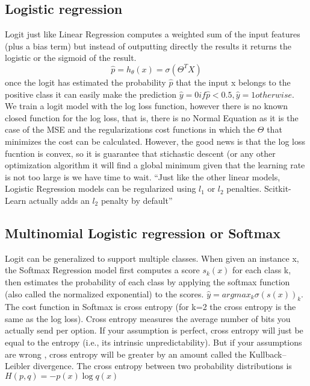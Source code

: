 \documentclass[12pt]{report}
\begin{document}
\subsection{Logistic regression}
Logit just like Linear Regression computes a weighted sum of the input features (plus a bias term) but instead of outputting directly the results it returns the logistic or the sigmoid of the result.
\begin{equation}
\hat{p} = h_{\theta}(x) = \sigma(\Theta^{T} X)
\end{equation}
once the logit has estimated the probability $\hat{p}$ that the input x belongs to the positive class it can easily make the prediction $\hat{y} = 0 if \hat{p} < 0.5, \hat{y} = 1 otherwise$. We train a logit model with the log loss function, however there is no known closed function for the log loss, that is, there is no Normal Equation as it is the case of the MSE and the regularizations cost functions in which the $\Theta$ that minimizes the cost can be calculated. However, the good news is that the log loss fucntion is convex, so it is guarantee that stichastic descent (or any other optimization algorithm it will find a global minimum given that the learning rate is not too large is we have time to wait.
“Just like the other linear models, Logistic Regression models can be regularized using $l_1$ or $l_2$ penalties. Scitkit-Learn actually adds an $l_2$ penalty by default”


\subsection{Multinomial Logistic regression or Softmax}

Logit can be generalized to support multiple classes. When given an instance x, the Softmax Regression model first computes a score $s_{k}(x)$ for each class k, then estimates the probability of each class by applying the softmax function (also called the normalized exponential) to the scores. $\hat{y}= argmax_{k} \sigma(s(x))_k$. The cost function in Softmax is cross entropy (for k=2 the cross entropy is the same as the log loss). Cross entropy measures the average number of bits you actually send per option. If your assumption is perfect, cross entropy will just be equal to the entropy (i.e., its intrinsic unpredictability). But if your assumptions are wrong , cross entropy will be greater by an amount called the Kullback–Leibler divergence. The cross entropy between two probability distributions is $ H(p,q)= -p(x)\log q(x)$
\end{document}

